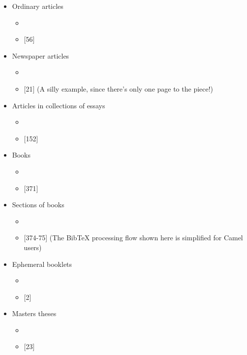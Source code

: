 \documentclass{article}
\begin{document}
\begin{itemize}
\item Ordinary articles
  \begin{itemize}
  \item {}
  \item {}[56]
  \end{itemize}
\item Newspaper articles
  \begin{itemize}
  \item {}
  \item {}[21] (A silly example,
    since there's only one page to the piece!)
  \end{itemize}
\item Articles in collections of essays
  \begin{itemize}
  \item {}
  \item {}[152]
  \end{itemize}
\item Books
  \begin{itemize}
  \item {}
  \item {}[371]
  \end{itemize}
\item Sections of books
  \begin{itemize}
  \item {}
  \item {}[374-75] (The BibTeX{}
    processing flow shown here is simplified for {\sc Camel} users)
  \end{itemize}
\item Ephemeral booklets
  \begin{itemize}
  \item {}
  \item {}[2]
  \end{itemize}
\item Masters theses
  \begin{itemize}
  \item {}
  \item {}[23]

\end{itemize}
\end{itemize}
\end{document}
